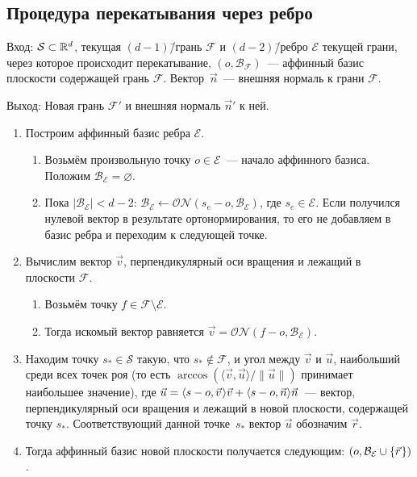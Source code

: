 \documentclass[a4paper,12pt]{article}
\newcommand{\R}[1][]{%
  \ifthenelse{\equal{#1}{}}%
  {\mathbb{R}}%
  {\mathbb{R}^{#1}}}
\newcommand{\Swarm}{\mathcal{S}}              %
\newcommand{\Facet}{\mathcal{F}}              %
\newcommand{\Edge}{\mathcal{E}}               %
\newcommand{\Basis}{\mathcal{B}}              %
\newcommand{\norm}[2][]{#1\lVert #2 #1\rVert}             %
\newcommand{\set}[2][]{#1\{ #2 #1\}}                    %
\newcommand{\scalprod}[3][]{#1\langle #2, #3 #1\rangle} %
\newcommand{\ONorm}[3][]{\mathcal{ON}#1( #2, #3 #1)} %
\renewcommand{\.}{\hspace{0.2ex}}
\begin{document}
  \subsection{Процедура перекатывания через ребро}
  \label{subsec:RollOverEdge}
    Вход: $\Swarm \subset \R[d]$, текущая $(d-1)$\=/грань $\Facet$ и $(d-2)$\=/ребро $\Edge$ текущей грани, через которое происходит перекатывание, $(o, \Basis_{\Facet})$~--- аффинный базис плоскости содержащей грань $\Facet$. Вектор~$\vec n$~--- внешняя нормаль к грани $\Facet$.

    Выход: Новая грань $\Facet'$ и внешняя нормаль $\vec n'$ к ней.

    \begin{enumerate}
      \item Построим аффинный базис ребра $\Edge$.
      \begin{enumerate}
        \item Возьмём произвольную точку $o \in \Edge$~--- начало аффинного базиса. Положим $\Basis_\Edge = \varnothing$.

        \item Пока $|\Basis_\Edge| < d-2$: $\Basis_\Edge \leftarrow \ONorm{s_e - o}{\Basis_\Edge}$, где $s_e \in \Edge$. Если получился нулевой вектор в результате ортонормирования, то его не добавляем в базис ребра и переходим к следующей точке.
      \end{enumerate}

      \item Вычислим вектор $\vec v$, перпендикулярный оси вращения и лежащий в плоскости $\Facet$.
      \begin{enumerate}
        \item Возьмём точку $f \in \Facet \setminus \Edge$.
        \item Тогда искомый вектор равняется $\vec v = \ONorm{f - o}{\Basis_\Edge}$.
      \end{enumerate}

      \item Находим точку $s_* \in \Swarm$ такую, что $s_* \notin \Facet$, и угол между $\vec v$ и $\vec u$, наибольший среди всех точек роя (то есть $\arccos(\scalprod{\vec v}{\vec u} / \norm{\vec u})$ принимает наибольшее значение), где $\vec u = \scalprod{s - o}{\vec v \.}\vec v + \scalprod{s - o}{\vec n}\vec n$~--- вектор, перпендикулярный оси вращения и лежащий в новой плоскости, содержащей точку $s_*$. Соответствующий данной точке~$s_*$ вектор $\vec u$ обозначим $\vec r$.

      \item Тогда аффинный базис новой плоскости получается следующим: $(o, \Basis_\Edge \cup \set{\vec r \.})$.


\end{enumerate}
\end{document}
